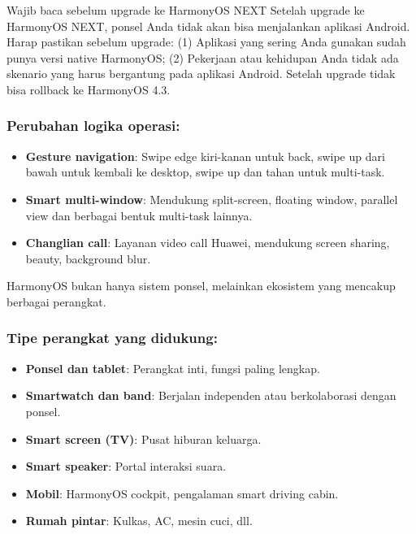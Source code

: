 \begin{tcbwarn}{Wajib baca sebelum upgrade ke HarmonyOS NEXT}
Setelah upgrade ke HarmonyOS NEXT, ponsel Anda tidak akan bisa menjalankan aplikasi Android. Harap pastikan sebelum upgrade: (1) Aplikasi yang sering Anda gunakan sudah punya versi native HarmonyOS; (2) Pekerjaan atau kehidupan Anda tidak ada skenario yang harus bergantung pada aplikasi Android. Setelah upgrade tidak bisa rollback ke HarmonyOS 4.3.

\end{tcbwarn}

\subsubsection*{Perubahan logika operasi:}

\begin{itemize}
  \item \textbf{Gesture navigation}: Swipe edge kiri-kanan untuk back, swipe up dari bawah untuk kembali ke desktop, swipe up dan tahan untuk multi-task.
  \item \textbf{Smart multi-window}: Mendukung split-screen, floating window, parallel view dan berbagai bentuk multi-task lainnya.
  \item \textbf{Changlian call}: Layanan video call Huawei, mendukung screen sharing, beauty, background blur.
\end{itemize}


HarmonyOS bukan hanya sistem ponsel, melainkan ekosistem yang mencakup berbagai perangkat.

\subsubsection*{Tipe perangkat yang didukung:}

\begin{itemize}
  \item \textbf{Ponsel dan tablet}: Perangkat inti, fungsi paling lengkap.
  \item \textbf{Smartwatch dan band}: Berjalan independen atau berkolaborasi dengan ponsel.
  \item \textbf{Smart screen (TV)}: Pusat hiburan keluarga.
  \item \textbf{Smart speaker}: Portal interaksi suara.
  \item \textbf{Mobil}: HarmonyOS cockpit, pengalaman smart driving cabin.
  \item \textbf{Rumah pintar}: Kulkas, AC, mesin cuci, dll.
\end{itemize}

